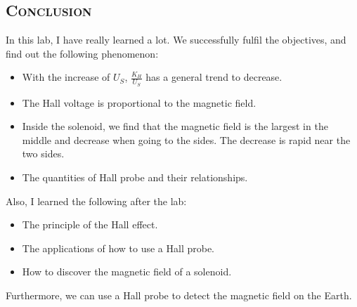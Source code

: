 \documentclass[a4paper,12pt]{article}
\begin{document}
\subsection{\textsc{Conclusion}}
In this lab, I have really learned a lot. We successfully fulfil the objectives, and find out the following phenomenon:
\begin{itemize}
\item With the increase of $U_S$, $\displaystyle \frac{K_H}{U_S}$ has a general trend to decrease.
\item The Hall voltage is proportional to the magnetic field.
\item Inside the solenoid, we find that the magnetic field is the largest in the middle and decrease when going to the sides. The decrease is rapid near the two sides.
\item The quantities of Hall probe and their relationships.
\end{itemize}
Also, I learned the following after the lab:
\begin{itemize}
\item The principle of the Hall effect.
\item The applications of how to use a Hall probe.
\item How to discover the magnetic field of a solenoid.
\end{itemize}
Furthermore, we can use a Hall probe to detect the magnetic field on the Earth.

\end{document}
